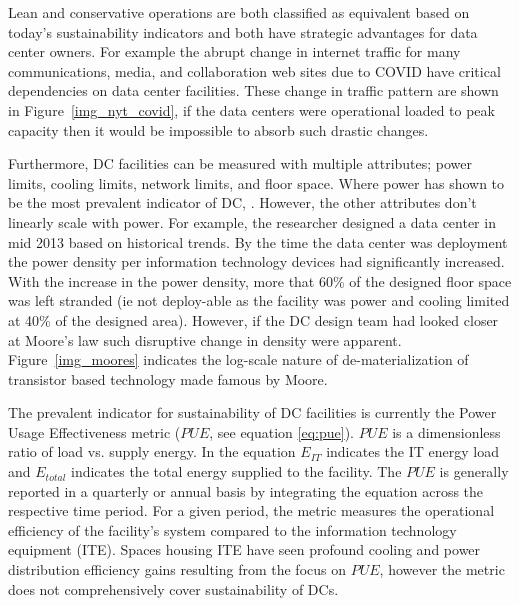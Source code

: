     Lean and conservative operations are both classified as equivalent based on today's sustainability indicators and both have strategic advantages for data center owners. For example the abrupt change in internet traffic for many communications, media, and collaboration web sites due to COVID have critical dependencies on data center facilities. These change in traffic pattern are shown in Figure~\ref{img_nyt_covid}, if the data centers were operational loaded to peak capacity then it would be impossible to absorb such drastic changes.
    
    
    
    Furthermore, DC facilities can be measured with multiple attributes; power limits, cooling limits, network limits, and floor space. Where power has shown to be the most prevalent indicator of DC, \cite{barroso18}. However, the other attributes don't linearly scale with power. For example, the researcher designed a data center in mid 2013 based on historical trends. By the time the data center was deployment the power density per information technology devices had significantly increased. With the increase in the power density, more that 60\% of the designed floor space was left stranded (ie not deploy-able as the facility was power and cooling limited at 40\% of the designed area). However, if the DC design team had looked closer at Moore's law such disruptive change in density were apparent. Figure~\ref{img_moores} indicates the log-scale nature of de-materialization of transistor based technology made famous by Moore.
    
    
    
    The prevalent indicator for sustainability of DC facilities is currently the Power Usage Effectiveness metric ($PUE$, see equation \ref{eq:pue}). $PUE$ is a dimensionless ratio of load vs. supply energy.   In the equation $E_{IT}$ indicates the IT energy load and $E_{total}$ indicates the total energy supplied to the facility. The $PUE$ is generally reported in a quarterly or annual basis by integrating the equation across the respective time period. For a given period, the metric measures the operational efficiency of the facility's system compared to the information technology equipment (ITE). Spaces housing ITE have seen profound cooling and power distribution efficiency gains resulting from the focus on $PUE$, however the metric does not comprehensively cover sustainability of DCs.
    
    
    
